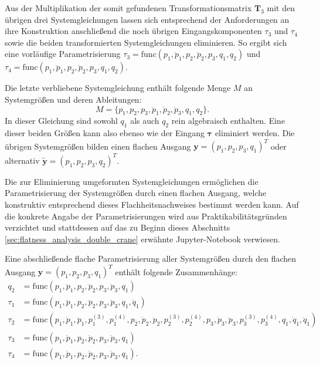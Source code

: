 Aus der Multiplikation der somit gefundenen Transformationsmatrix $\mathbf{T}_3$ mit den übrigen drei Systemgleichungen lassen sich entsprechend der Anforderungen an ihre Konstruktion anschließend die noch übrigen Eingangskomponenten $\tau_{3}$ und $\tau_{4}$ sowie die beiden transformierten Systemgleichungen eliminieren. So ergibt sich eine vorläufige Parametrisierung ${\tau_3 = \mathrm{func}(p_1, \ddot{p}_1, p_2, \ddot{p}_2, p_3, q_1, q_2)}$ und ${\tau_4 = \mathrm{func}(p_1, \ddot{p}_1, p_2, \ddot{p}_2, p_3, q_1, q_2)}$.

Die letzte verbliebene Systemgleichung enthält folgende Menge $M$ an Systemgrößen und deren Ableitungen:
\begin{equation}
	M = \{p_1, p_2, p_3, \ddot{p}_1, \ddot{p}_2, \ddot{p}_3, q_1, q_2 \}.
\end{equation}
In dieser Gleichung sind sowohl $q_1$ als auch $q_2$ rein algebraisch enthalten. Eine dieser beiden Größen kann also ebenso wie der Eingang $\boldsymbol{\tau}$ eliminiert werden. Die übrigen Systemgrößen bilden einen flachen Ausgang $\mathbf{y} = (p_1, p_2, p_3, q_1)^T$ oder alternativ ${\tilde{\mathbf{y}} = (p_1, p_2, p_3, q_2)^T}$.

Die zur Eliminierung umgeformten Systemgleichungen ermöglichen die Parametrisierung der Systemgrößen durch einen flachen Ausgang, welche konstruktiv entsprechend dieses Flachheitsnachweises bestimmt werden kann. Auf die konkrete Angabe der Parametrisierungen wird aus Praktikabilitätsgründen verzichtet und stattdessen auf das zu Beginn dieses Abschnitts \ref{sec:flatness_analysis_double_crane} erwähnte Jupyter-Notebook verwiesen.

Eine abschließende flache Parametrisierung aller Systemgrößen durch den flachen Ausgang $\mathbf{y} = (p_1, p_2, p_3, q_1)^T$ enthält folgende Zusammenhänge:
\begin{subequations}
	\begin{align}
		q_2 &= \mathrm{func}(p_1, \ddot{p}_1, p_2, \ddot{p}_2, p_3, \ddot{p}_3, q_1) \\
		\tau_1 &= \mathrm{func}(p_1, \ddot{p}_1, p_2, \ddot{p}_2, p_3, \ddot{p}_3, q_1, \ddot{q}_1) \\
		\tau_2 &= \mathrm{func}(p_1, \dot{p}_1, \ddot{p}_1, p_1^{(3)}, p_1^{(4)}, p_2, \dot{p}_2, \ddot{p}_2, p_2^{(3)}, p_2^{(4)}, p_3, \dot{p}_3, \ddot{p}_3, p_3^{(3)}, p_3^{(4)}, q_1, \dot{q}_1, \ddot{q}_1) \\
		\tau_3 &= \mathrm{func}(p_1, \ddot{p}_1, p_2, \ddot{p}_2, p_3, \ddot{p}_3, q_1) \\
		\tau_4 &= \mathrm{func}(p_1, \ddot{p}_1, p_2, \ddot{p}_2, p_3, \ddot{p}_3, q_1).
	\end{align}
\end{subequations}


